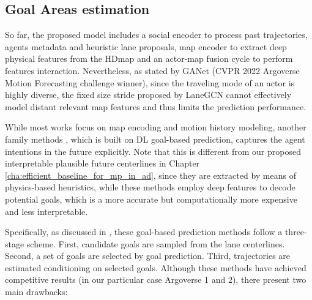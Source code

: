 \subsection{Goal Areas estimation}
\label{subsec:7_improving_efficiency_goal_areas_estimation}

So far, the proposed model includes a social encoder to process past trajectories, agents metadata and heuristic lane proposals, map encoder to extract deep physical features from the \ac{HDmap} and an actor-map fusion cycle to perform features interaction. Nevertheless, as stated by GANet \cite{wang2022ganet} (CVPR 2022 Argoverse Motion Forecasting challenge winner), since the traveling mode of an actor is highly diverse, the fixed size stride proposed by LaneGCN cannot effectively model distant relevant map features and thus limits the prediction performance.

While most works \cite{mercat2020multi,casas2018intentnet,chai2019multipath,liang2020learning,gomez2022exploring} focus on map encoding and motion history modeling, another family methods \cite{zhao2021tnt,gu2021densetnt, dendorfer2020goal}, which is built on \ac{DL} goal-based prediction, captures the agent intentions in the future explicitly. Note that this is different from our proposed interpretable plausible future centerlines in Chapter \ref{cha:efficient_baseline_for_mp_in_ad}, since they are extracted by means of physics-based heuristics, while these methods employ deep features to decode potential goals, which is a more accurate but computationally more expensive and less interpretable.

Specifically, as discussed in \cite{wang2022ganet}, these goal-based prediction methods follow a three-stage scheme. First, candidate goals are sampled from the lane centerlines. Second, a set of goals are selected by goal prediction. Third, trajectories are estimated conditioning on selected goals. Although these methods have achieved competitive results (in our particular case Argoverse 1 and 2), there present two main drawbacks:

